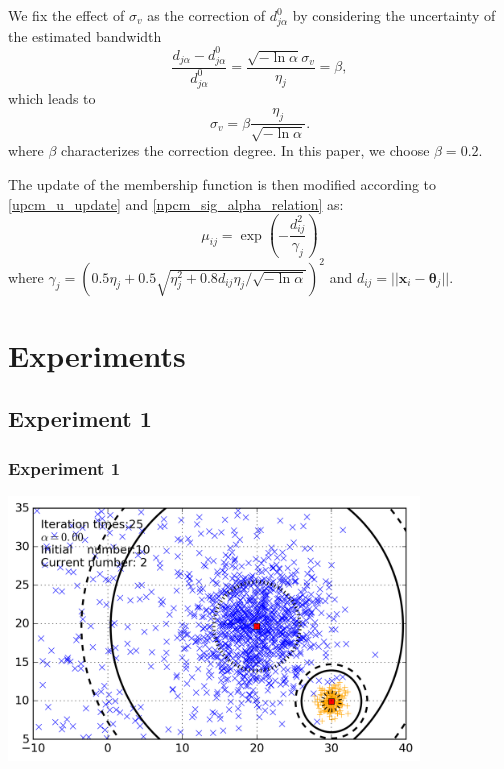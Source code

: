 \documentclass{beamer}
\begin{document}
\begin{frame}
  We fix the effect of $\sigma_v$ as the correction of $d_{j\alpha}^0$
  by considering the uncertainty of the estimated bandwidth
  \begin{equation}
    \frac{d_{j\alpha}-d_{j\alpha}^0}{d_{j\alpha}^0}=\frac{\sqrt{-\ln\alpha}\sigma_v}{\eta_j}=\beta,
  \end{equation}
  which leads to
  \begin{equation}
    \label{npcm_sig_alpha_relation}
    \sigma_v=\beta\frac{\eta_j}{\sqrt{-\ln\alpha}}.
  \end{equation}
  where $\beta$ characterizes the correction degree.  In this paper,
  we choose $\beta=0.2$.
\end{frame}

\begin{frame}
  The update of the membership function is then modified according to
  \eqref{upcm_u_update} and \eqref{npcm_sig_alpha_relation} as:
  \begin{equation}
    \label{npcm_u_update}
    \mu_{ij}=\exp\left(-\frac{d_{ij}^2}{\gamma_j}\right)
  \end{equation}
  where
  $\gamma_j=\left(0.5\eta_{j}+0.5\sqrt{\eta_{j}^{2}+0.8d_{ij}\eta_j/\sqrt{-\ln\alpha}}\right)^2$
  and $d_{ij}=||\mathbf{x}_i-\boldsymbol{\theta}_j||$.
\end{frame}

\section{Experiments}

\subsection{Experiment 1}


\begin{frame}
  \frametitle{Experiment 1}
  \includegraphics[height=7cm]{img/small_cluster_structure_preserve_last_frame_n_10_alpha_0_0.png}
\end{frame}
\end{document}
